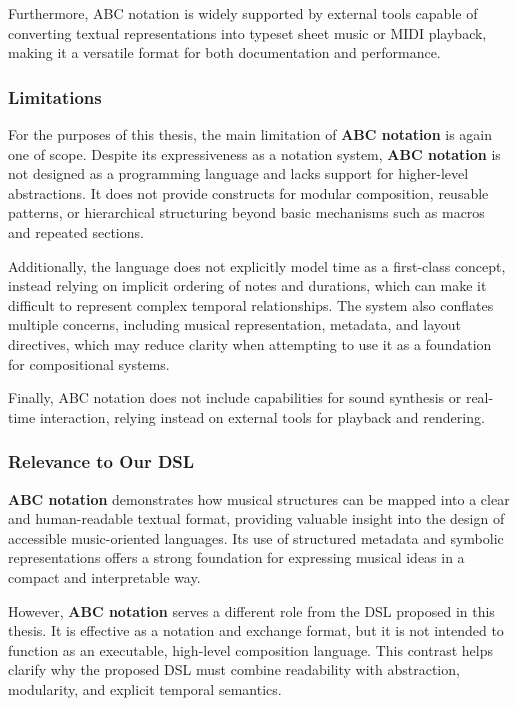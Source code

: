 Furthermore, ABC notation is widely supported by external tools capable of converting textual representations into
typeset sheet music or MIDI playback, making it a versatile format for both documentation and performance.


\subsubsection{Limitations}

For the purposes of this thesis, the main limitation of \textbf{ABC notation} is again one of scope.
Despite its expressiveness as a notation system, \textbf{ABC notation} is not designed as a programming language and
lacks support for higher-level abstractions.
It does not provide constructs for modular composition, reusable patterns, or hierarchical structuring beyond basic
mechanisms such as macros and repeated sections.

Additionally, the language does not explicitly model time as a first-class concept, instead relying on implicit ordering
of notes and durations, which can make it difficult to represent complex temporal relationships.
The system also conflates multiple concerns, including musical representation, metadata, and layout directives, which
may reduce clarity when attempting to use it as a foundation for compositional systems.

Finally, ABC notation does not include capabilities for sound synthesis or real-time interaction, relying instead on
external tools for playback and rendering.


\subsubsection{Relevance to Our DSL}

\textbf{ABC notation} demonstrates how musical structures can be mapped into a clear and human-readable textual format,
providing valuable insight into the design of accessible music-oriented languages.
Its use of structured metadata and symbolic representations offers a strong foundation for expressing musical ideas in a
compact and interpretable way.

However, \textbf{ABC notation} serves a different role from the DSL proposed in this thesis.
It is effective as a notation and exchange format, but it is not intended to function as an executable, high-level
composition language.
This contrast helps clarify why the proposed DSL must combine readability with abstraction, modularity, and explicit
temporal semantics.
